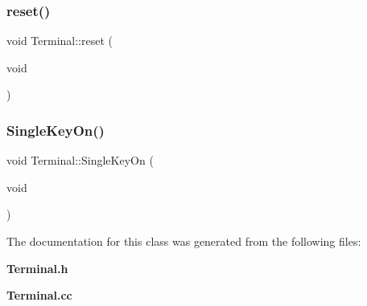 \mbox{\label{classTerminal_a6db86b9b3383817618a568c2b135cf25}} 
\subsubsection{reset()}
{\footnotesize\ttfamily void Terminal\+::reset (\begin{DoxyParamCaption}\item[{void}]{ }\end{DoxyParamCaption})}

\mbox{\label{classTerminal_abe4bde36d5f5edac8e47361fc610fbe0}} 
\subsubsection{Single\+Key\+On()}
{\footnotesize\ttfamily void Terminal\+::\+Single\+Key\+On (\begin{DoxyParamCaption}\item[{void}]{ }\end{DoxyParamCaption})}



The documentation for this class was generated from the following files\+:\begin{DoxyCompactItemize}
\item 
\textbf{ Terminal.\+h}\item 
\textbf{ Terminal.\+cc}\end{DoxyCompactItemize}
